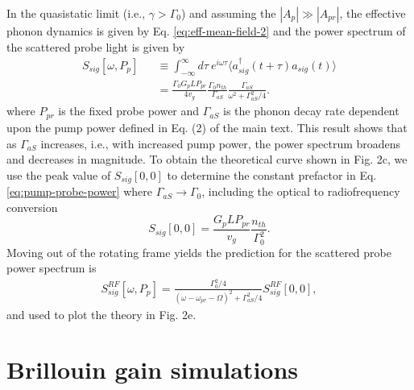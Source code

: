In the quasistatic limit (i.e., $\gamma > \Gamma_0$) and assuming the $|A_p| \gg |A_{pr}|$, the effective phonon dynamics is given by Eq. \eqref{eq:eff-mean-field-2} and the power spectrum of the scattered probe light is given by
\begin{eqnarray}
\label{eq:pump-probe-power}
    S_{sig}[\omega,P_p] && \equiv \int_{-\infty}^\infty d\tau \ e^{i\omega\tau}\langle a^\dag_{sig}(t+\tau) a_{sig} (t) \rangle \nonumber  \\
   && = \frac{\Gamma_0 G_p L P_{pr} }{4 v_g} \frac{\Gamma_0 n_{th}}{\Gamma_{aS}} \frac{\Gamma_{aS}}{\omega^2 + \Gamma_{aS}^2/4}.
\end{eqnarray}
where $P_{pr}$ is the fixed probe power and $\Gamma_{aS}$ is the phonon decay rate dependent upon the pump power defined in Eq. (2) of the main text. This result shows that as $\Gamma_{aS}$ increases, i.e., with increased pump power, the power spectrum broadens and decreases in magnitude. To obtain the theoretical curve shown in Fig. 2c, we use the peak value of $S_{sig}[0,0]$ to determine the constant prefactor in Eq. \eqref{eq:pump-probe-power} where $\Gamma_{aS} \to \Gamma_0$, including the optical to radiofrequency conversion
\begin{equation}
    S_{sig}[0,0] = \frac{ G_p L P_{pr} }{ v_g} \frac{n_{th}}{\Gamma_{0}^2}.
\end{equation}
Moving out of the rotating frame yields the prediction for the scattered probe power spectrum is
\begin{eqnarray}
\label{eq:pump-probe-power-RF}
    S^{RF}_{sig}[\omega,P_p] = \frac{\Gamma_{0}^2/4}{(\omega-\omega_{pr}-\Omega)^2 + \Gamma_{aS}^2/4} S^{RF}_{sig}[0,0],
\end{eqnarray}
and used to plot the theory in Fig. 2e.

\section{Brillouin gain simulations}

